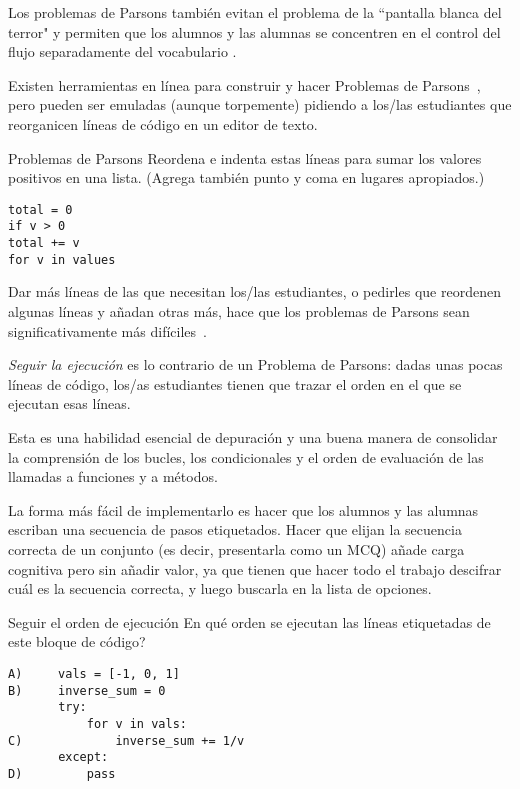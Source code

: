 Los problemas de Parsons  también evitan el problema de la ``pantalla blanca del terror" y permiten que los alumnos y las alumnas se concentren en el control del flujo separadamente del vocabulario \cite{Pars2006,Eric2015,Morr2016,Eric2017}.

Existen herramientas  en línea para construir y hacer Problemas de Parsons~\cite{Ihan2011},
pero pueden ser emuladas (aunque torpemente) 
pidiendo a los/las estudiantes que reorganicen líneas de código en un editor de texto.

\begin{aside}{Problemas de Parsons}
  Reordena e indenta estas líneas para sumar los valores positivos en una lista.
  (Agrega también punto y coma en lugares apropiados.)

\begin{verbatim}
total = 0
if v > 0
total += v
for v in values
\end{verbatim}
\end{aside}

Dar más líneas de las que necesitan los/las estudiantes, o pedirles que reordenen algunas líneas y añadan otras más, hace que los problemas de Parsons sean significativamente más difíciles~\cite{Harm2016}.

\emph{Seguir la ejecución} es lo contrario de un Problema de Parsons: 
dadas unas pocas líneas de código, 
los/as estudiantes tienen que trazar el orden en el que se ejecutan esas líneas.


Esta es una habilidad esencial de depuración
 y una buena manera de consolidar la comprensión de los bucles, los condicionales y el orden de evaluación de las llamadas a funciones y a métodos.

La forma más fácil de implementarlo es hacer que los alumnos y las alumnas escriban una secuencia de pasos etiquetados.
Hacer que elijan la secuencia correcta de un conjunto 
(es decir, presentarla como un MCQ) 
añade carga cognitiva pero sin añadir valor, 
ya que tienen que hacer todo el trabajo descifrar cuál es la secuencia correcta, y luego buscarla en la lista de opciones.

\begin{aside}{Seguir el orden de ejecución}
  En qué orden se ejecutan las líneas etiquetadas de este bloque de código?

\begin{verbatim}
A)     vals = [-1, 0, 1]
B)     inverse_sum = 0
       try:
           for v in vals:
C)             inverse_sum += 1/v
       except:
D)         pass
\end{verbatim}
\end{aside}

